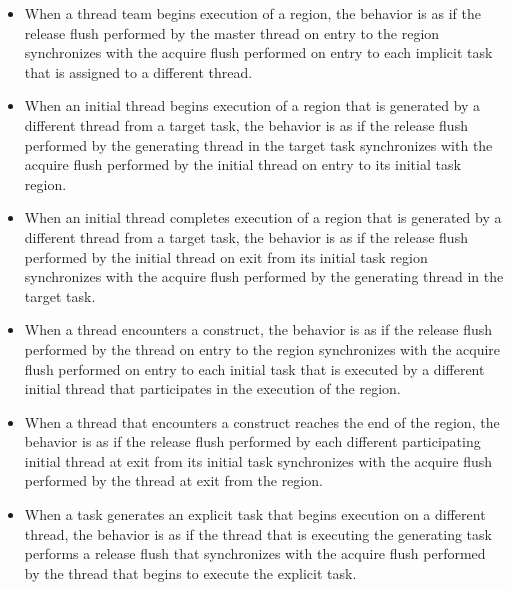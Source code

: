\begin{itemize}
    \item When a thread team begins execution of a  region, the
        behavior is as if the release flush performed by the master thread on
        entry to the  region synchronizes with the acquire
        flush performed on entry to each implicit task that is assigned to a
        different thread.

    \item When an initial thread begins execution of a  region
        that is generated by a different thread from a target task, the
        behavior is as if the release flush performed by the generating thread
        in the target task synchronizes with the acquire flush performed by the
        initial thread on entry to its initial task region.

    \item When an initial thread completes execution of a  region that is
        generated by a different thread from a target task, the behavior is as
        if the release flush performed by the initial thread on exit from its
        initial task region synchronizes with the acquire flush performed by
        the generating thread in the target task.

    \item When a thread encounters a  construct, the behavior is as if the
        release flush performed by the thread on entry to the  region
        synchronizes with the acquire flush performed on entry to each initial
        task that is executed by a different initial thread that participates
        in the execution of the  region.

    \item When a thread that encounters a  construct reaches the end
        of the  region, the behavior is as if the release flush
        performed by each different participating initial thread at exit from
        its initial task synchronizes with the acquire flush performed by the
        thread at exit from the  region.

    \item When a task generates an explicit task that begins execution on a
        different thread, the behavior is as if the thread that is executing
        the generating task performs a release flush that synchronizes with
        the acquire flush performed by the thread that begins to execute the
        explicit task.


\end{itemize}
